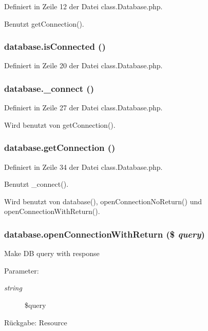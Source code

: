 Definiert in Zeile 12 der Datei class.Database.php.

Benutzt getConnection().
\subsubsection{\setlength{\rightskip}{0pt plus 5cm}database.isConnected ()}\label{classdatabase_d7f6deaa91401a3e7aee229fc5fcecaa}




Definiert in Zeile 20 der Datei class.Database.php.
\subsubsection{\setlength{\rightskip}{0pt plus 5cm}database.\_\-connect ()}\label{classdatabase_d9c71dd6be5850e3e01ff6d3a024393b}




Definiert in Zeile 27 der Datei class.Database.php.

Wird benutzt von getConnection().
\subsubsection{\setlength{\rightskip}{0pt plus 5cm}database.getConnection ()}\label{classdatabase_b3d4aa200cbc6e4849d7a3d01a53ab7c}




Definiert in Zeile 34 der Datei class.Database.php.

Benutzt \_\-connect().

Wird benutzt von database(), openConnectionNoReturn() und openConnectionWithReturn().
\subsubsection{\setlength{\rightskip}{0pt plus 5cm}database.openConnectionWithReturn (\$ {\em query})}\label{classdatabase_7a013da8af493c45e1731916dd4998f8}


Make DB query with response

\begin{Desc}
\item[Parameter:]
\begin{description}
\item[{\em string}]\$query \end{description}
\end{Desc}
\begin{Desc}
\item[Rückgabe:]Resource \end{Desc}


